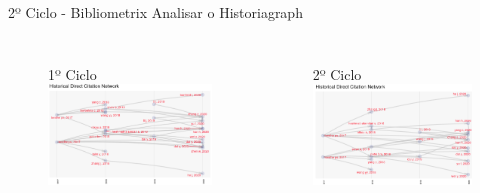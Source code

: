 \begin{frame}{2º Ciclo - Bibliometrix}
	Analisar o Historiagraph
	\begin{columns}
		\begin{figure}[hb]
      1º Ciclo
			\includegraphics[width=1\textwidth]{figures/histold.png}
		\end{figure}
		\begin{figure}[ht]
      2º Ciclo
      \includegraphics[width=1\textwidth]{figures/histnovo.png}
		\end{figure}
	\end{columns}
\end{frame}

